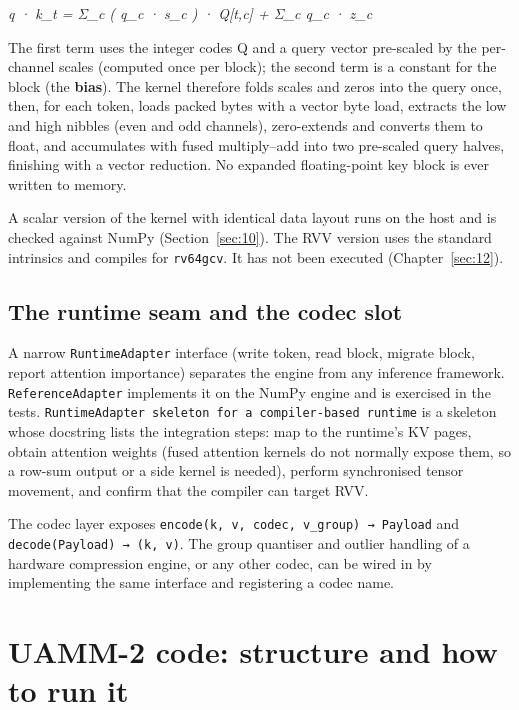 \documentclass[12pt,a4paper]{report}
\begin{document}
\begin{center}\small\textit{q · k\_\allowbreak{}t = Σ\_\allowbreak{}c ( q\_\allowbreak{}c · s\_\allowbreak{}c ) · Q[t,c]  +  Σ\_\allowbreak{}c q\_\allowbreak{}c · z\_\allowbreak{}c}\end{center}
The first term uses the integer codes Q and a query vector pre-scaled by the per-channel scales (computed once per block); the second term is a constant for the block (the \textbf{bias}). The kernel therefore folds scales and zeros into the query once, then, for each token, loads packed bytes with a vector byte load, extracts the low and high nibbles (even and odd channels), zero-extends and converts them to float, and accumulates with fused multiply–add into two pre-scaled query halves, finishing with a vector reduction. No expanded floating-point key block is ever written to memory.

A scalar version of the kernel with identical data layout runs on the host and is checked against NumPy (Section~\ref{sec:10}). The RVV version uses the standard intrinsics and compiles for \texttt{rv64gcv}. It has not been executed (Chapter~\ref{sec:12}).

\subsection{The runtime seam and the codec slot}\label{sec:5_10}
A narrow \texttt{RuntimeAdapter} interface (write token, read block, migrate block, report attention importance) separates the engine from any inference framework. \texttt{ReferenceAdapter} implements it on the NumPy engine and is exercised in the tests. \texttt{RuntimeAdapter skeleton for a compiler-based runtime} is a skeleton whose docstring lists the integration steps: map to the runtime's KV pages, obtain attention weights (fused attention kernels do not normally expose them, so a row-sum output or a side kernel is needed), perform synchronised tensor movement, and confirm that the compiler can target RVV.

The codec layer exposes \texttt{encode(k, v, codec, v\_\allowbreak{}\allowbreak{}group) → Payload} and \texttt{decode(Payload) → (k, v)}. The group quantiser and outlier handling of a hardware compression engine, or any other codec, can be wired in by implementing the same interface and registering a codec name.

\section{UAMM-2 code: structure and how to run it}
\end{document}
